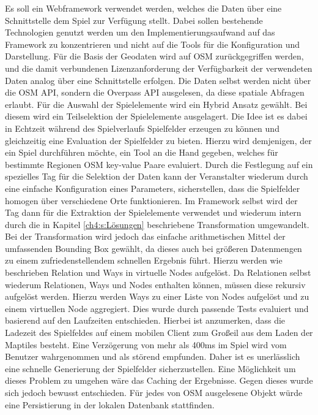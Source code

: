Es soll ein Webframework verwendet werden, welches die Daten über eine Schnittstelle dem Spiel zur Verfügung stellt. Dabei sollen bestehende Technologien genutzt werden um den Implementierungsaufwand auf das Framework zu konzentrieren und nicht auf die Tools für die Konfiguration und Darstellung.
Für die Basis der Geodaten wird auf OSM zurückgegriffen werden, und die damit verbundenen Lizenzanforderung der Verfügbarkeit der verwendeten Daten analog über eine Schnittstelle erfolgen. Die Daten selbst werden nicht über die OSM API, sondern die Overpass API ausgelesen, da diese spatiale Abfragen erlaubt.
Für die Auswahl der Spielelemente wird ein Hybrid Ansatz gewählt. Bei diesem wird ein Teilselektion der Spielelemente ausgelagert.
Die Idee ist es dabei in Echtzeit während des Spielverlaufs Spielfelder erzeugen zu können und gleichzeitig eine Evaluation der Spielfelder zu bieten. Hierzu wird demjenigen, der ein Spiel durchführen möchte, ein Tool an die Hand gegeben, welches für bestimmte Regionen OSM key-value Paare evaluiert. Durch die Festlegung auf ein spezielles Tag für die Selektion der Daten kann der Veranstalter wiederum durch eine einfache Konfiguration eines Parameters, sicherstellen, dass die Spielfelder homogen über verschiedene Orte funktionieren. Im Framework selbst wird der Tag dann für die Extraktion der Spielelemente verwendet und wiederum intern durch die in Kapitel \ref{ch4:s:Lösungen} beschriebene Transformation umgewandelt. Bei der Transformation wird jedoch das einfache arithmetischen Mittel der umfassenden Bounding Box gewählt, da dieses auch bei größeren Datenmengen zu einem zufriedenstellendem schnellen Ergebnis führt. Hierzu werden wie beschrieben Relation und Ways in virtuelle Nodes aufgelöst. Da Relationen selbst wiederum Relationen, Ways und Nodes enthalten können, müssen diese rekursiv aufgelöst werden. Hierzu werden Ways zu einer Liste von Nodes aufgelöst und zu einem virtuellen Node aggregiert. Dies wurde durch passende Tests evaluiert und basierend auf den Laufzeiten entschieden. Hierbei ist anzumerken, dass die Ladezeit des Spielfeldes auf einem mobilen Client zum Großeil aus dem Laden der Maptiles besteht. Eine Verzögerung von mehr als 400ms im Spiel wird vom Benutzer wahrgenommen und als störend empfunden.\cite{Gutwin.2004} Daher ist es unerlässlich eine schnelle Generierung der Spielfelder sicherzustellen. 
Eine Möglichkeit um dieses Problem zu umgehen wäre das Caching der Ergebnisse. Gegen dieses wurde sich jedoch bewusst entschieden. Für jedes von OSM ausgelesene Objekt würde eine Persistierung in der lokalen Datenbank stattfinden.
